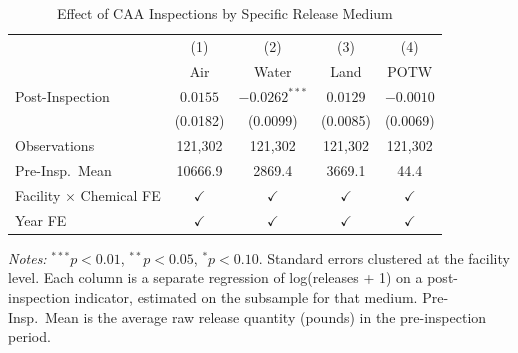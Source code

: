 \begin{table}[t]
\centering
\caption{Effect of CAA Inspections by Specific Release Medium}
\label{tab:decomp}
\begin{tabular}{lcccc}
\hline\hline
& (1) & (2) & (3) & (4) \\
& Air & Water & Land & POTW \\
\hline
Post-Inspection & $0.0155$ & $-0.0262^{***}$ & $0.0129$ & $-0.0010$ \\
& (0.0182) & (0.0099) & (0.0085) & (0.0069) \\
\hline
Observations & 121,302 & 121,302 & 121,302 & 121,302 \\
Pre-Insp.\ Mean & 10666.9 & 2869.4 & 3669.1 & 44.4 \\
Facility $\times$ Chemical FE & $\checkmark$ & $\checkmark$ & $\checkmark$ & $\checkmark$ \\
Year FE & $\checkmark$ & $\checkmark$ & $\checkmark$ & $\checkmark$ \\
\hline\hline
\end{tabular}
\vspace{0.3em}
\begin{minipage}{\textwidth}
\footnotesize
\textit{Notes:} $^{***}p<0.01$, $^{**}p<0.05$, $^{*}p<0.10$. Standard errors clustered at the facility level. Each column is a separate regression of log(releases + 1) on a post-inspection indicator, estimated on the subsample for that medium. Pre-Insp.\ Mean is the average raw release quantity (pounds) in the pre-inspection period.
\end{minipage}
\end{table}
